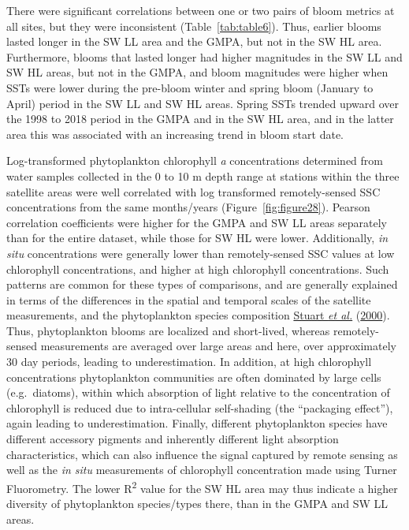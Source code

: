 \documentclass[12pt]{article}\usepackage[]{graphicx}\usepackage[]{color}
\begin{document}
There were significant correlations between one or two pairs of bloom metrics at all sites, but they were inconsistent (Table~\ref{tab:table6}). Thus, earlier blooms lasted longer in the SW LL area and the GMPA, but not in the SW HL area. Furthermore, blooms that lasted longer had higher magnitudes in the SW LL and SW HL areas, but not in the GMPA, and bloom magnitudes were higher when SSTs were lower during the pre-bloom winter and spring bloom (January to April) period in the SW LL and SW HL areas. Spring SSTs trended upward over the 1998 to 2018 period in the GMPA and in the SW HL area, and in the latter area this was associated with an increasing trend in bloom start date.

Log-transformed phytoplankton chlorophyll \emph{a} concentrations determined from water samples collected in the 0 to 10 m depth range at stations within the three satellite areas were well correlated with log transformed remotely-sensed SSC concentrations from the same months/years (Figure~\ref{fig:figure28}). Pearson correlation coefficients were higher for the GMPA and SW LL areas separately than for the entire dataset, while those for SW HL were lower. Additionally, \emph{in situ} concentrations were generally lower than remotely-sensed SSC values at low chlorophyll concentrations, and higher at high chlorophyll concentrations. Such patterns are common for these types of comparisons, and are generally explained in terms of the differences in the spatial and temporal scales of the satellite measurements, and the phytoplankton species composition \protect\hyperlink{ref-stuart_2000}{Stuart \textit{et al.}} (\protect\hyperlink{ref-stuart_2000}{2000}). Thus, phytoplankton blooms are localized and short-lived, whereas remotely-sensed measurements are averaged over large areas and here, over approximately 30 day periods, leading to underestimation. In addition, at high chlorophyll concentrations phytoplankton communities are often dominated by large cells (e.g.~diatoms), within which absorption of light relative to the concentration of chlorophyll is reduced due to intra-cellular self-shading (the ``packaging effect''), again leading to underestimation. Finally, different phytoplankton species have different accessory pigments and inherently different light absorption characteristics, which can also influence the signal captured by remote sensing as well as the \emph{in situ} measurements of chlorophyll concentration made using Turner Fluorometry. The lower R\textsuperscript{2} value for the SW HL area may thus indicate a higher diversity of phytoplankton species/types there, than in the GMPA and SW LL areas.
\end{document}
